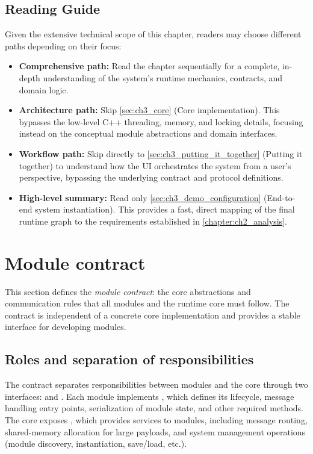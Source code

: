 \subsection{Reading Guide} \label{sec:ch3_reading_guide}

Given the extensive technical scope of this chapter, readers may choose different paths depending on their focus:
\begin{itemize}
    \item \textbf{Comprehensive path:} Read the chapter sequentially for a complete, in-depth understanding of the system's runtime mechanics, contracts, and domain logic.
    \item \textbf{Architecture path:} Skip \autoref{sec:ch3_core} (Core implementation). This bypasses the low-level C++ threading, memory, and locking details, focusing instead on the conceptual module abstractions and domain interfaces.
    \item \textbf{Workflow path:} Skip directly to \autoref{sec:ch3_putting_it_together} (Putting it together) to understand how the UI orchestrates the system from a user's perspective, bypassing the underlying contract and protocol definitions.
    \item \textbf{High-level summary:} Read only \autoref{sec:ch3_demo_configuration} (End-to-end system instantiation). This provides a fast, direct mapping of the final runtime graph to the requirements established in \autoref{chapter:ch2_analysis}.
\end{itemize}



\section{Module contract} \label{sec:ch3_module_contract}

This section defines the \emph{module contract}: the core abstractions and communication rules that all modules and the runtime core must follow. The contract is independent of a concrete core implementation and provides a stable interface for developing modules.

\subsection{Roles and separation of responsibilities} \label{subsec:ch3_roles}

The contract separates responsibilities between modules and the core through two interfaces:  and . Each module implements , which defines its lifecycle, message handling entry points, serialization of module state, and other required methods. The core exposes , which provides services to modules, including message routing, shared-memory allocation for large payloads, and system management operations (module discovery, instantiation, save/load, etc.).

